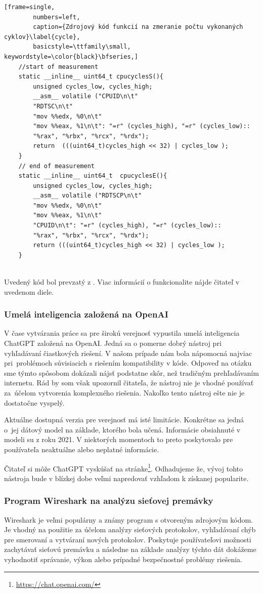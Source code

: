  \begin{minipage}{\linewidth} 	
	\begin{lstlisting}[frame=single,
		numbers=left,
		caption={Zdrojový kód funkcií na zmeranie počtu vykonaných cyklov}\label{cycle},
		basicstyle=\ttfamily\small, keywordstyle=\color{black}\bfseries,]
	//start of measurement
	static __inline__ uint64_t cpucyclesS(){
		unsigned cycles_low, cycles_high;
		__asm__ volatile ("CPUID\n\t"
		"RDTSC\n\t"
		"mov %%edx, %0\n\t"
		"mov %%eax, %1\n\t": "=r" (cycles_high), "=r" (cycles_low)::
		"%rax", "%rbx", "%rcx", "%rdx");
		return  (((uint64_t)cycles_high << 32) | cycles_low );
	}
	// end of measurement
	static __inline__ uint64_t  cpucyclesE(){
		unsigned cycles_low, cycles_high;
		__asm__ volatile ("RDTSCP\n\t"
		"mov %%edx, %0\n\t"
		"mov %%eax, %1\n\t"
		"CPUID\n\t": "=r" (cycles_high), "=r" (cycles_low)::
		"%rax", "%rbx", "%rcx", "%rdx");
		return (((uint64_t)cycles_high << 32) | cycles_low );
	}
	\end{lstlisting}
\end{minipage}\\ 
Uvedený kód bol prevzatý z \cite{bc}. Viac informácií o funkcionalite nájde čitateľ v uvedenom diele. 

\subsubsection{Umelá inteligencia založená na OpenAI \cite{gpt}} 
V čase vytvárania práce sa pre širokú verejnosť vypustila umelá inteligencia ChatGPT založená na OpenAI. Jedná sa o pomerne dobrý nástroj pri vyhľadávaní čiastkových riešení. V našom prípade nám bola nápomocná najviac pri~problémoch súvisiacich s riešením kompatibility v kóde. Odpoveď na otázku sme týmto spôsobom dokázali nájsť podstatne skôr, než tradičným prehľadávaním internetu. Rád by som však upozornil čitateľa, že nástroj nie je vhodné používať za~účelom vytvorenia komplexného riešenia. Nakoľko tento nástroj ešte nie je dostatočne vyspelý. 
  
Aktuálne dostupná verzia pre verejnosť má isté limitácie. Konkrétne sa jedná o~jej dátový model na základe, ktorého bola učená. Informácie obsiahnuté v modeli su z roku 2021. V niektorých momentoch to preto poskytovalo pre používateľa neaktuálne alebo neplatné informácie.
 
Čitateľ si môže ChatGPT vyskúšať na stránke\footnote{\url{https://chat.openai.com/}}. Odhadujeme že, vývoj tohto nástroja bude v blízkej dobe veľmi napredovať vzhľadom k získanej popularite. 
\subsubsection{Program Wireshark na analýzu sieťovej premávky \cite{wireshark}} 
Wireshark je veľmi populárny a známy program s otvoreným zdrojovým kódom. Je vhodný na použitie za účelom analýzy sieťových protokolov, vyhľadávaní chýb pre smerovaní a vytváraní nových protokolov. Poskytuje používateľovi možnosti zachytávať sieťovú premávku a následne na základe analýzy týchto dát dokážeme vyhodnotiť správanie, výkon alebo prípadné bezpečnostné problémy riešenia.

